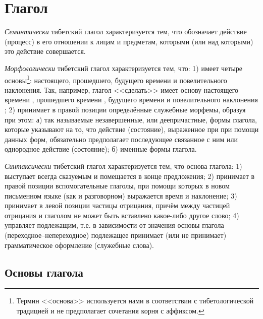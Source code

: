 \section{Глагол}

\label{sec:glagol}\emph{Семантически} тибетский глагол характеризуется тем, что обозначает действие (процесс) в его отношении к лицам и предметам, которыми (или над которыми) это действие совершается.

\emph{Морфологически} тибетский глагол характеризуется тем, что: 1) имеет четыре основы\footnote[32]{Термин <<основа>> используется нами в соответствии с тибетологической традицией и не предполагает сочетания корня с аффиксом.}: настоящего, прошедшего, будущего времени и повелительного наклонения. Так, например, глагол <<сделать>> имеет основу настоящего времени , прошедшего времени , будущего времени  и повелительного наклонения ; 2) принимает в правой позиции определённые служебные морфемы, образуя при этом: а) так называемые незавершенные, или деепричастные, формы глагола, которые указывают на то, что действие (состояние), выраженное при при помощи данных форм, обязательно предполагает последующее связанное с ним или однородное действие (состояние); б) именные формы глагола.

\emph{Синтаксически} тибетский глагол характеризуется тем, что основа глагола: 1) выступает всегда сказуемым и помещается в конце предложения; 2) принимает в правой позиции вспомогательные глаголы, при помощи которых в новом письменном языке (как и разговорном) выражается время и наклонение; 3) принимает в левой позиции частицы отрицания, причём между частицей отрицания и глаголом не может быть вставлено какое-либо другое слово; 4) управляет подлежащим, т.е. в зависимости от значения основы глагола (переходное--непереходное) подлежащее принимает (или не принимает) грамматическое оформление (служебные слова).

\subsection{Основы глагола}

